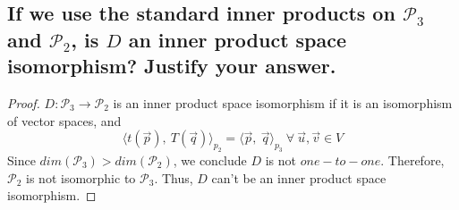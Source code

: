 \documentclass[../main.tex]{subfiles}
\begin{document}
\subsection{If we use the standard inner products on $\mathcal{P}_3$ and $\mathcal{P}_2$, is $D$ an inner product space isomorphism? Justify your answer.}
\begin{proof}
        $\displaystyle D:\mathcal{P}_{3}\rightarrow \mathcal{P}_{2}$ is an inner product space isomorphism if it is an isomorphism of vector spaces, and
        \begin{equation*}
                \langle t(\vec{p}) ,\ T(\vec{q}) \rangle _{p_{2}} =\langle \vec{p} ,\ \vec{q} \rangle _{p_{3}} \ \forall \ \vec{u} ,\vec{v} \in V
        \end{equation*}
        Since $\displaystyle dim(\mathcal{P}_{3})  >dim(\mathcal{P}_{2})$, we conclude $\displaystyle D$ is not $\displaystyle one-to-one$. Therefore, $\displaystyle \mathcal{P}_{2}$ is not isomorphic to $\displaystyle \mathcal{P}_{3}$. Thus, $\displaystyle D$ can't be an inner product space isomorphism.
\end{proof}
\end{document}
